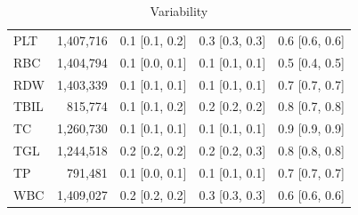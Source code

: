 \begin{table}[ht]
\begin{tabular}{lrrrr}
PLT & 1,407,716 & 0.1 [0.1, 0.2] & 0.3 [0.3, 0.3] & 0.6 [0.6, 0.6] \\
RBC & 1,404,794 & 0.1 [0.0, 0.1] & 0.1 [0.1, 0.1] & 0.5 [0.4, 0.5] \\
RDW & 1,403,339 & 0.1 [0.1, 0.1] & 0.1 [0.1, 0.1] & 0.7 [0.7, 0.7] \\
TBIL & 815,774 & 0.1 [0.1, 0.2] & 0.2 [0.2, 0.2] & 0.8 [0.7, 0.8] \\
TC & 1,260,730 & 0.1 [0.1, 0.1] & 0.1 [0.1, 0.1] & 0.9 [0.9, 0.9] \\
TGL & 1,244,518 & 0.2 [0.2, 0.2] & 0.2 [0.2, 0.3] & 0.8 [0.8, 0.8] \\
TP & 791,481 & 0.1 [0.0, 0.1] & 0.1 [0.1, 0.1] & 0.7 [0.7, 0.7] \\
WBC & 1,409,027 & 0.2 [0.2, 0.2] & 0.3 [0.3, 0.3] & 0.6 [0.6, 0.6] \\
\bottomrule
\end{tabular}
\caption{Variability}
\label{tab:variability}
\end{table}